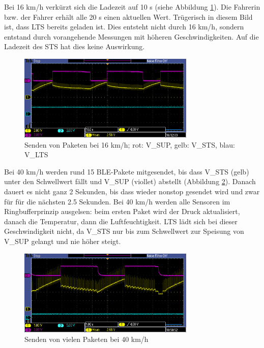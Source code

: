 Bei 16 km/h verkürzt sich die Ladezeit auf 10 s (siehe Abbildung \ref{paket_16kmh}). Die Fahrerin bzw. der Fahrer erhält alle 20 s einen aktuellen Wert. Trügerisch in diesem Bild ist, dass LTS bereits geladen ist. Dies entsteht nicht durch 16 km/h, sondern entstand durch vorangehende Messungen mit höheren Geschwindigkeiten. Auf die Ladezeit des STS hat dies keine Auswirkung.

\begin{figure}[ht]
   \includegraphics[width=0.75\textwidth]{4Resultate/imag/pic2.PNG}
    \caption{Senden von Paketen bei 16 km/h; rot: V\_SUP, gelb: V\_STS, blau: V\_LTS}
    \label{paket_16kmh}
\end{figure}

Bei 40 km/h werden rund 15 BLE-Pakete mitgesendet, bis dass V\_STS (gelb) unter den Schwellwert fällt und V\_SUP (viollet) abstellt (Abbildung \ref{paket_40kmh}). Danach dauert es nicht ganz 2 Sekunden, bis dass wieder nonstop gesendet wird und zwar für für die nächsten 2.5 Sekunden. Bei 40 km/h werden alle Sensoren im Ringbufferprinzip ausgelsen: beim ersten Paket wird der Druck aktualisiert, danach die Temperatur, dann die Luftfeuchtigkeit. LTS lädt sich bei dieser Geschwindigkeit nicht, da V\_STS nur bis zum Schwellwert zur Speisung von V\_SUP gelangt und nie höher steigt.

\begin{figure}[ht]
   \includegraphics[width=0.75\textwidth]{4Resultate/imag/pic4.PNG}
    \caption{Senden von vielen Paketen bei 40 km/h}
    \label{paket_40kmh}
\end{figure}


